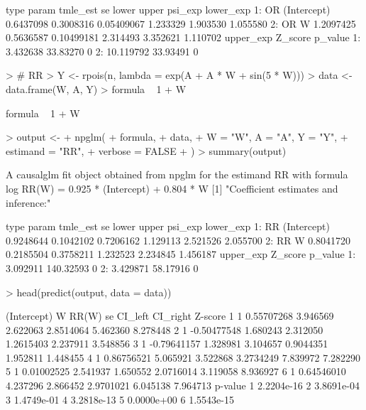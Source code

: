 \documentclass{article}
\begin{document}
\begin{Schunk}
\begin{Soutput}
   type       param  tmle_est        se      lower    upper  psi_exp lower_exp
1:   OR (Intercept) 0.6437098 0.3008316 0.05409067 1.233329 1.903530  1.055580
2:   OR           W 1.2097425 0.5636587 0.10499181 2.314493 3.352621  1.110702
   upper_exp  Z_score p_value
1:  3.432638 33.83270       0
2: 10.119792 33.93491       0
\end{Soutput}
\begin{Sinput}
> # RR
> Y <- rpois(n, lambda = exp(A + A * W + sin(5 * W)))
> data <- data.frame(W, A, Y)
> formula ~ 1 + W
\end{Sinput}
\begin{Soutput}
formula ~ 1 + W
\end{Soutput}
\begin{Sinput}
> output <-
+   npglm(
+     formula,
+     data,
+     W = "W", A = "A", Y = "Y",
+     estimand = "RR",
+     verbose = FALSE
+   )
> summary(output)
\end{Sinput}
\begin{Soutput}
A causalglm fit object obtained from npglm for the estimand RR with formula 
log RR(W) = 0.925 * (Intercept) + 0.804 * W
[1] "Coefficient estimates and inference:"

   type       param  tmle_est        se     lower    upper  psi_exp lower_exp
1:   RR (Intercept) 0.9248644 0.1042102 0.7206162 1.129113 2.521526  2.055700
2:   RR           W 0.8041720 0.2185504 0.3758211 1.232523 2.234845  1.456187
   upper_exp   Z_score p_value
1:  3.092911 140.32593       0
2:  3.429871  58.17916       0
\end{Soutput}
\begin{Sinput}
> head(predict(output, data = data))
\end{Sinput}
\begin{Soutput}
  (Intercept)           W    RR(W)       se   CI_left CI_right  Z-score
1           1  0.55707268 3.946569 2.622063 2.8514064 5.462360 8.278448
2           1 -0.50477548 1.680243 2.312050 1.2615403 2.237911 3.548856
3           1 -0.79641157 1.328981 3.104657 0.9044351 1.952811 1.448455
4           1  0.86756521 5.065921 3.522868 3.2734249 7.839972 7.282290
5           1  0.01002525 2.541937 1.650552 2.0716014 3.119058 8.936927
6           1  0.64546010 4.237296 2.866452 2.9701021 6.045138 7.964713
     p-value
1 2.2204e-16
2 3.8691e-04
3 1.4749e-01
4 3.2818e-13
5 0.0000e+00
6 1.5543e-15
\end{Soutput}
\end{Schunk}
\end{document}
